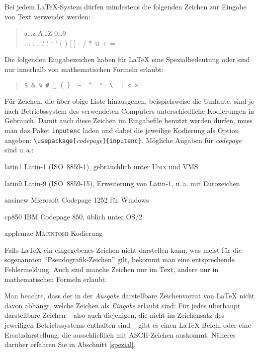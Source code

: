 Bei jedem \LaTeX-System dürfen mindestens die folgenden Zeichen zur Eingabe von 
Text verwendet werden:
\begin{quote}
  \ttfamily
  a\dots z A\dots Z 0\dots 9 \\
  . : ; , ? ! ` ' ( ) [ ] - / * @ + =
\end{quote}
Die folgenden Eingabezeichen haben für \LaTeX{} eine Spezialbedeutung oder sind 
nur innerhalb von mathematischen Formeln erlaubt:
\begin{quote}
\verb.$ & % # _ { }  ~  ^  "  \  | < >.
\end{quote}
Für Zeichen, die über obige Liste hinausgehen, beispielsweise die Umlaute, sind 
je nach Betriebssystem des verwendeten Computers unterschiedliche Kodierungen in
Gebrauch.  Damit auch diese Zeichen im Eingabefile benutzt werden dürfen,  muss 
man das Paket \texttt{inputenc} laden und dabei die jeweilige Kodierung als 
Option angeben: \verb:\usepackage[:\textit{codepage}\verb:]{inputenc}:.
Mögliche Angaben für \textit{codepage} sind u.\,a.:
\begin{ttdescription}
  \item[latin1] Latin-1 (ISO~8859-1), gebräuchlich unter \textsc{Unix} und VMS
  \item[latin9] Latin-9 (ISO~8859-15), Erweiterung von Latin-1, u.\,a. mit 
                Eurozeichen
  \item[ansinew] Microsoft Codepage 1252 für Windows
  \item[cp850] IBM Codepage 850, üblich unter OS/2
  \item[applemac] \textsc{Macintosh}-Kodierung
\end{ttdescription}
Falls \LaTeX{} ein eingegebenes Zeichen nicht darstellen kann, was meist für die
sogenannten "`Pseudografik-Zeichen"' gilt,  bekommt man eine entsprechende 
Fehlermeldung. Auch sind manche Zeichen nur im Text, andere nur in 
mathematischen Formeln erlaubt.

Man beachte, dass der in der \emph{Ausgabe} darstellbare Zeichenvorrat von 
\LaTeX{} nicht davon abhängt, welche Zeichen als \emph{Eingabe} erlaubt sind:
Für jedes überhaupt darstellbare Zeichen -- also auch diejenigen, die nicht im 
Zeichensatz des jeweiligen Betriebssystems enthalten sind -- gibt es einen 
\LaTeX-Befehl oder eine Ersatzdarstellung, die ausschließlich mit ASCII-Zeichen 
auskommt.  Näheres darüber erfahren Sie in Abschnitt \ref{spezial}.

\endinput
